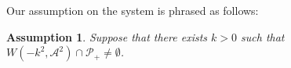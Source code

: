 \documentclass[11pt,a4paper,oneside]{amsart}
\theoremstyle{plain}
\newtheorem{assumption}[theorem]{Assumption}
\theoremstyle{remark}
\numberwithin{equation}{section}
\def\({\left(}
\def\){\right)}
\theoremstyle{definition}
\begin{document}
Our assumption on the system is phrased as follows:
\begin{assumption}\label{A:main}
Suppose that there exists $k>0$ such that
$W(-k^2, \mathscr{A}^2)\cap \mathcal{P}_+\neq \emptyset$.
\end{assumption}
\end{document}
